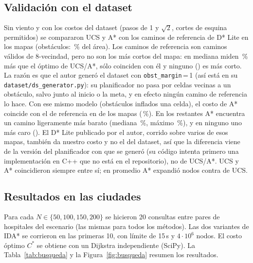 \documentclass[11pt]{article}
\theoremstyle{remark}
\begin{document}
\subsection{Validación con el dataset}
Sin viento y con los costos del dataset (pasos de 1 y $\sqrt2$, cortes de esquina permitidos) se
compararon UCS y A* con los caminos de referencia de D* Lite en los \valMapas{} mapas (obstáculos:
\valObst\,\% del área). Los \valCaminosValidos{} caminos de referencia son caminos válidos de
8-vecindad, pero no son los más cortos del mapa: en mediana miden \valMedRatio\,\% más que el óptimo de
UCS/A*, sólo \valIguales{} coinciden con él y ninguno (\valMasCortos) es más corto. La razón es que el
autor generó el dataset con \texttt{obst\_margin}\,=\,1 (así está en su
\texttt{dataset/ds\_generator.py}): su planificador no pasa por celdas vecinas a un obstáculo, salvo
junto al inicio o la meta, y en efecto ningún camino de referencia lo hace. Con ese mismo modelo
(obstáculos inflados una celda), el costo de A* coincide con el de referencia en \valIgualesHolg{} de los
\valMapas{} mapas (\valPctHolg\,\%). En los \valMayorHolg{} restantes A* encuentra un camino ligeramente
más barato (mediana \valMedExcHolg\,\%, máximo \valMaxExcHolg\,\%), y en ninguno uno más caro
(\valMenorHolg). El D* Lite publicado por el autor, corrido sobre varios de esos mapas, también da
nuestro costo y no el del dataset, así que la diferencia viene de la versión del planificador con que
se generó (su código intenta primero una implementación en C++ que no está en el repositorio), no de
UCS/A*. UCS y A* coincidieron siempre entre sí; en promedio A* expandió \valExpA{} nodos contra
\valExpUCS{} de UCS.

\subsection{Resultados en las ciudades}
Para cada $N\in\{50,100,150,200\}$ se hicieron 20 consultas entre pares de hospitales del
escenario (las mismas para todos los métodos). Las dos variantes de IDA* se corrieron en las
primeras 10, con límite de 15\,s y $4\cdot10^6$ nodos. El costo óptimo $C^*$ se obtiene con un
Dijkstra independiente (SciPy). La Tabla~\ref{tab:busqueda} y la Figura~\ref{fig:busqueda} resumen los
resultados.

\begin{table}[t]
\centering\scriptsize
\caption{Búsqueda de rutas en las ciudades (media $\pm$ d.e. sobre las consultas resueltas;
memoria pico de Python medida con \texttt{tracemalloc} en las 3 primeras consultas, para las que llegan al
límite repitiendo la búsqueda hasta el mismo número de nodos; brecha respecto a $C^*$).}
\label{tab:busqueda}
\setlength{\tabcolsep}{4pt}

\end{table}
\end{document}
